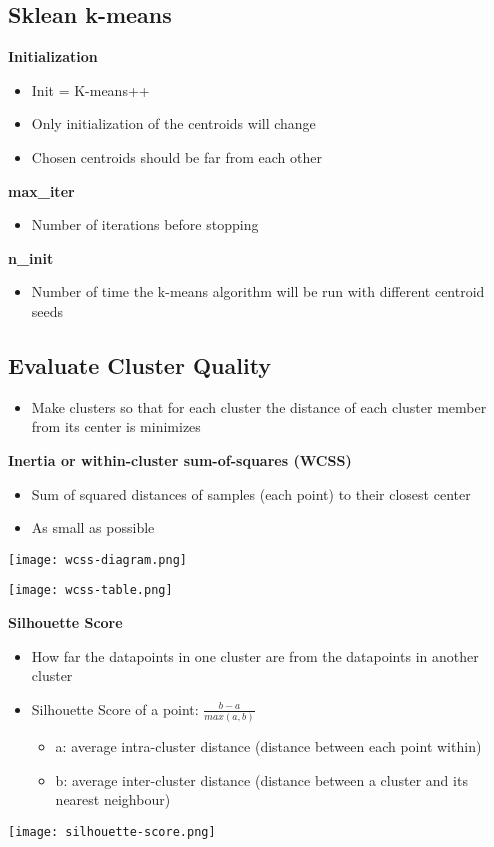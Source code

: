 \subsection{Sklean k-means}
\textbf{Initialization}
\begin{itemize}
    \item Init = K-means++
    \item Only initialization of the centroids will change
    \item Chosen centroids should be far from each other
\end{itemize}
\textbf{max\_iter}
\begin{itemize}
    \item Number of iterations before stopping
\end{itemize}
\vspace{10pt}
\textbf{n\_init}
\begin{itemize}
    \item Number of time the k-means algorithm will be run with different centroid seeds
\end{itemize}

\subsection{Evaluate Cluster Quality}
\begin{itemize}
    \item Make clusters so that for each cluster the distance of each cluster member from its center is minimizes
\end{itemize}
\vspace{10pt}
\textbf{Inertia or within-cluster sum-of-squares (WCSS)}
\begin{itemize}
    \item Sum of squared distances of samples (each point) to their closest center
    \item As small as possible
\end{itemize}

\begin{minipage}[t]{0.5\linewidth}
    \texttt{[image: wcss-diagram.png]}
\end{minipage}
\begin{minipage}[t]{0.5\linewidth}
    \texttt{[image: wcss-table.png]}
\end{minipage}
\vspace{10pt}
\textbf{Silhouette Score}
\begin{itemize}
    \item How far the datapoints in one cluster are from the datapoints in another cluster
    \item Silhouette Score of a point: $\frac{b-a}{max(a,b)}$
    \begin{itemize}
        \item a: average intra-cluster distance (distance between each point within)
        \item b: average inter-cluster distance (distance between a cluster and its nearest neighbour)
    \end{itemize}
\end{itemize}
\texttt{[image: silhouette-score.png]}
